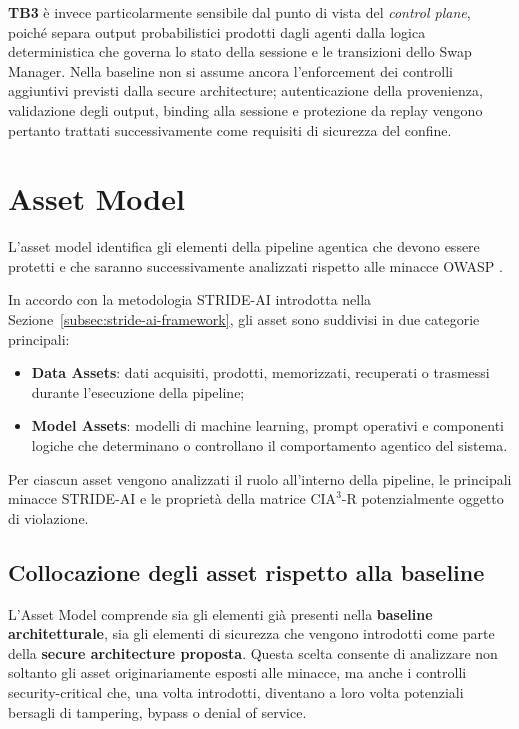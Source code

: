 \documentclass[11pt,a4paper]{article}
\begin{document}
\textbf{TB3} è invece particolarmente sensibile dal punto di vista del
\emph{control plane}, poiché separa output probabilistici prodotti dagli
agenti dalla logica deterministica che governa lo stato della sessione
e le transizioni dello Swap Manager. Nella baseline non si assume ancora
l'enforcement dei controlli aggiuntivi previsti dalla secure
architecture; autenticazione della provenienza, validazione degli
output, binding alla sessione e protezione da replay vengono pertanto
trattati successivamente come requisiti di sicurezza del confine.


\section{Asset Model}
\label{sec:asset-model}

L'asset model identifica gli elementi della pipeline agentica che devono essere protetti e che saranno successivamente analizzati rispetto alle minacce OWASP \cite{owaspagentic}.

In accordo con la metodologia STRIDE-AI introdotta nella Sezione~\ref{subsec:stride-ai-framework}, gli asset sono suddivisi in due categorie principali:
\begin{itemize}
    \item \textbf{Data Assets}: dati acquisiti, prodotti, memorizzati, recuperati o trasmessi durante l'esecuzione della pipeline;
    \item \textbf{Model Assets}: modelli di machine learning, prompt operativi e componenti logiche che determinano o controllano il comportamento agentico del sistema.
\end{itemize}

Per ciascun asset vengono analizzati il ruolo all'interno della pipeline, le principali minacce STRIDE-AI e le proprietà della matrice $\text{CIA}^3\text{-R}$ potenzialmente oggetto di violazione.

\subsection*{Collocazione degli asset rispetto alla baseline}
\label{subsec:asset-baseline}

L'Asset Model comprende sia gli elementi già presenti nella
\textbf{baseline architetturale}, sia gli elementi di sicurezza che
vengono introdotti come parte della \textbf{secure architecture
proposta}. Questa scelta consente di analizzare non soltanto gli asset
originariamente esposti alle minacce, ma anche i controlli
security-critical che, una volta introdotti, diventano a loro volta
potenziali bersagli di tampering, bypass o denial of service.
\end{document}
